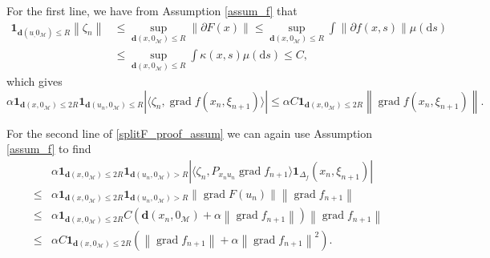 \documentclass{article}
\newcommand{\CM}{\mathcal{M}}
\newcommand{\rd}{\mathrm{d}}
\newcommand{\bd}{\mathbf{d}}
\DeclareMathOperator{\grad}{grad}
\newcommand{\norm}[1]{\left\lVert#1\right\rVert}
\begin{document}
For the first line, we have from Assumption \ref{assum_f} that
\begin{equation}
    \begin{aligned}
        \mathbf{1}_{\bd(u_,0_\CM)\leq R}\norm{\zeta_n}&\leq\sup_{\bd(x,0_\CM)\leq R}\norm{\partial F(x)}\leq \sup_{\bd(x,0_\CM)\leq R}\int \norm{\partial f(x,s)}\mu(\rd s)\\
        &\leq \sup_{\bd(x,0_\CM)\leq R}\int\kappa(x,s)\mu(\rd s)\leq C,
    \end{aligned}
\end{equation}
which gives
\begin{equation}\label{proof_assum_1}
    \alpha\mathbf{1}_{\bd(x,0_\CM)\leq 2R}\mathbf{1}_{\bd(u_n,0_\CM)\leq R}|\langle\zeta_n,\grad f(x_n,\xi_{n+1})\rangle|\leq \alpha C\mathbf{1}_{\bd(x,0_\CM)\leq 2R}\norm{\grad f(x_n,\xi_{n+1})}.
\end{equation}

For the second line of \eqref{splitF_proof_assum} we can again use Assumption \ref{assum_f} to find
\begin{equation}\label{proof_assum_2}
    \begin{aligned}
        &\alpha\mathbf{1}_{\bd(x,0_\CM)\leq 2R}\mathbf{1}_{\bd(u_n,0_\CM)> R}|\langle\zeta_n,P_{x_nu_n}\grad f_{n+1}\rangle\mathbf{1}_{\Delta_f}(x_n,\xi_{n+1})|\\
        \leq&\alpha\mathbf{1}_{\bd(x,0_\CM)\leq 2R}\mathbf{1}_{\bd(u_n,0_\CM)> R}\norm{\grad F(u_n)}\norm{\grad f_{n+1}}\\
        \leq&\alpha\mathbf{1}_{\bd(x,0_\CM)\leq 2R}C(\bd(x_n,0_\CM)+\alpha\norm{\grad f_{n+1}})\norm{\grad f_{n+1}}\\
        \leq&\alpha C\mathbf{1}_{\bd(x,0_\CM)\leq 2R}(\norm{\grad f_{n+1}}+\alpha\norm{\grad f_{n+1}}^2).
    \end{aligned}
\end{equation}
\end{document}
